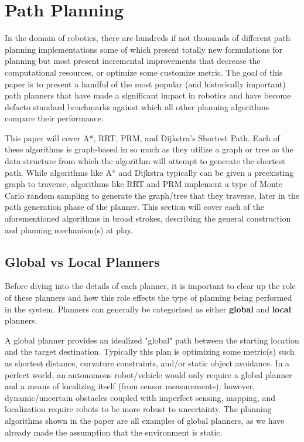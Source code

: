 \section{Path Planning}

In the domain of robotics, there are hundreds if not thousands of different path planning implementations some of which present totally new formulations for planning but most present incremental improvements that decrease the computational resources, or optimize some customize metric. The goal of this paper is to present a handful of the most popular (and historically important) path planners that have made a significant impact in robotics and have become defacto standard benchmarks against which all other planning algorithms compare their performance. 

This paper will cover A*, RRT, PRM, and Dijkstra's Shortest Path. Each of these algorithms is graph-based in so much as they utilize a graph or tree as the data structure from which the algorithm will attempt to generate the shortest path. While algorithms like A* and Dijkstra typically can be given a preexisting graph to traverse, algorithms like RRT and PRM implement a type of Monte Carlo random sampling to generate the graph/tree that they traverse, later in the path generation phase of the planner.  This section will cover each of the aforementioned algorithms in broad strokes, describing the general construction and planning mechanism(s) at play.

\subsection{Global vs Local Planners}

Before diving into the details of each planner, it is important to clear up the role of these planners and how this role effects the type of planning being performed in the system. Planners can generally be categorized as either \textbf{global} and \textbf{local} planners.  

A global planner provides an idealized "global" path between the starting location and the target destination. Typically this plan is optimizing some metric(s) such as shortest distance, curvature constraints, and/or static object avoidance. In a perfect world, an autonomous robot/vehicle would only require a global planner and a means of localizing itself (from sensor measurements); however, dynamic/uncertain obstacles coupled with imperfect sensing, mapping, and localization require robots to be more robust to uncertainty. The planning algorithms shown in the paper are all examples of global planners, as we have already made the assumption that the environment is static. 

